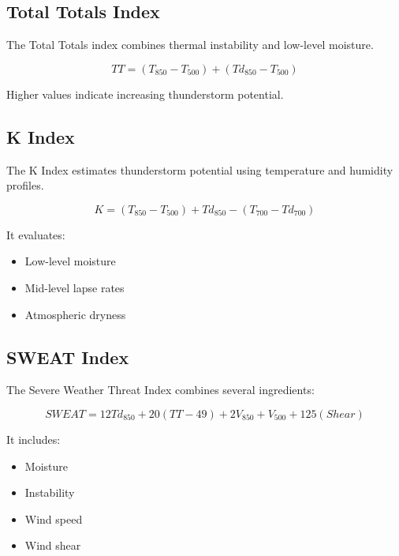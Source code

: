 
\subsection{Total Totals Index}

The Total Totals index combines thermal instability and low-level
moisture.

\[
TT =
(T_{850}-T_{500})
+
(Td_{850}-T_{500})
\]

Higher values indicate increasing thunderstorm potential.


\subsection{K Index}

The K Index estimates thunderstorm potential using temperature and
humidity profiles.

\[
K =
(T_{850}-T_{500})
+
Td_{850}
-
(T_{700}-Td_{700})
\]

It evaluates:

\begin{itemize}

\item Low-level moisture

\item Mid-level lapse rates

\item Atmospheric dryness

\end{itemize}


\subsection{SWEAT Index}

The Severe Weather Threat Index combines several ingredients:

\[
SWEAT =
12Td_{850}
+
20(TT-49)
+
2V_{850}
+
V_{500}
+
125(Shear)
\]

It includes:

\begin{itemize}

\item Moisture

\item Instability

\item Wind speed

\item Wind shear

\end{itemize}

